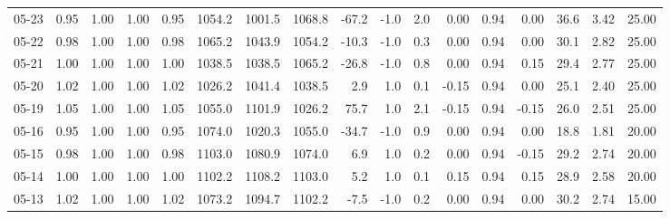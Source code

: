 \begin{threeparttable}
{\begin{tabular}{lrrrrrrrrrrrrrrrr}
  05-23 &         0.95 &           1.00 &          1.00 &          0.95 & 1054.2 & 1001.5 & 1068.8 &      -67.2 &                     -1.0 &                 2.0 &       0.00 &      0.94 &           0.00 &             36.6 &            3.42 &                  25.00 \\
  05-22 &         0.98 &           1.00 &          1.00 &          0.98 & 1065.2 & 1043.9 & 1054.2 &      -10.3 &                     -1.0 &                 0.3 &       0.00 &      0.94 &           0.00 &             30.1 &            2.82 &                  25.00 \\
  05-21 &         1.00 &           1.00 &          1.00 &          1.00 & 1038.5 & 1038.5 & 1065.2 &      -26.8 &                     -1.0 &                 0.8 &       0.00 &      0.94 &           0.15 &             29.4 &            2.77 &                  25.00 \\
  05-20 &         1.02 &           1.00 &          1.00 &          1.02 & 1026.2 & 1041.4 & 1038.5 &        2.9 &                      1.0 &                 0.1 &      -0.15 &      0.94 &           0.00 &             25.1 &            2.40 &                  25.00 \\
  05-19 &         1.05 &           1.00 &          1.00 &          1.05 & 1055.0 & 1101.9 & 1026.2 &       75.7 &                      1.0 &                 2.1 &      -0.15 &      0.94 &          -0.15 &             26.0 &            2.51 &                  25.00 \\
  05-16 &         0.95 &           1.00 &          1.00 &          0.95 & 1074.0 & 1020.3 & 1055.0 &      -34.7 &                     -1.0 &                 0.9 &       0.00 &      0.94 &           0.00 &             18.8 &            1.81 &                  20.00 \\
  05-15 &         0.98 &           1.00 &          1.00 &          0.98 & 1103.0 & 1080.9 & 1074.0 &        6.9 &                      1.0 &                 0.2 &       0.00 &      0.94 &          -0.15 &             29.2 &            2.74 &                  20.00 \\
  05-14 &         1.00 &           1.00 &          1.00 &          1.00 & 1102.2 & 1108.2 & 1103.0 &        5.2 &                      1.0 &                 0.1 &       0.15 &      0.94 &           0.15 &             28.9 &            2.58 &                  20.00 \\
  05-13 &         1.02 &           1.00 &          1.00 &          1.02 & 1073.2 & 1094.7 & 1102.2 &       -7.5 &                     -1.0 &                 0.2 &       0.00 &      0.94 &           0.00 &             30.2 &            2.74 &                  15.00 \\

\end{tabular}}
\end{threeparttable}
